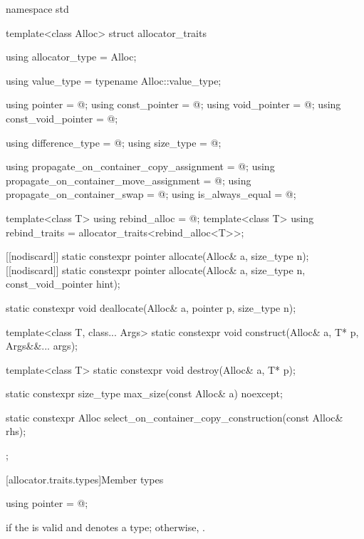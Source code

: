 %
\begin{codeblock}
namespace std {
  template<class Alloc> struct allocator_traits {
    using allocator_type     = Alloc;

    using value_type         = typename Alloc::value_type;

    using pointer            = @\seebelow@;
    using const_pointer      = @\seebelow@;
    using void_pointer       = @\seebelow@;
    using const_void_pointer = @\seebelow@;

    using difference_type    = @\seebelow@;
    using size_type          = @\seebelow@;

    using propagate_on_container_copy_assignment = @\seebelow@;
    using propagate_on_container_move_assignment = @\seebelow@;
    using propagate_on_container_swap            = @\seebelow@;
    using is_always_equal                        = @\seebelow@;

    template<class T> using rebind_alloc = @\seebelow@;
    template<class T> using rebind_traits = allocator_traits<rebind_alloc<T>>;

    [[nodiscard]] static constexpr pointer allocate(Alloc& a, size_type n);
    [[nodiscard]] static constexpr pointer allocate(Alloc& a, size_type n,
                                                    const_void_pointer hint);

    static constexpr void deallocate(Alloc& a, pointer p, size_type n);

    template<class T, class... Args>
      static constexpr void construct(Alloc& a, T* p, Args&&... args);

    template<class T>
      static constexpr void destroy(Alloc& a, T* p);

    static constexpr size_type max_size(const Alloc& a) noexcept;

    static constexpr Alloc select_on_container_copy_construction(const Alloc& rhs);
  };
}
\end{codeblock}

[allocator.traits.types]{Member types}

%
\begin{itemdecl}
using pointer = @\seebelow@;
\end{itemdecl}

\begin{itemdescr}
\pnum
\ctype {} if
the   is valid and denotes a
type; otherwise, .
\end{itemdescr}

